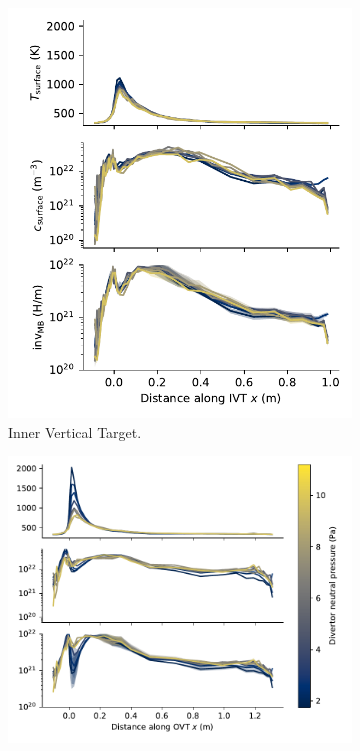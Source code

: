 \begin{figure}[h!]
    \captionsetup[subfigure]{format=plain,singlelinecheck=true}  %
    \centering
    \begin{subfigure}{0.42\linewidth}
        \includegraphics[width=\linewidth]{Figures/Chapter4/ITER/inventory_along_inner_divertor.pdf}
        \caption{Inner Vertical Target.}
    \end{subfigure}%
    \begin{subfigure}{0.58\linewidth}
        \includegraphics[width=\linewidth]{Figures/Chapter4/ITER/inventory_along_outer_divertor.pdf}

\end{subfigure}
\end{figure}
